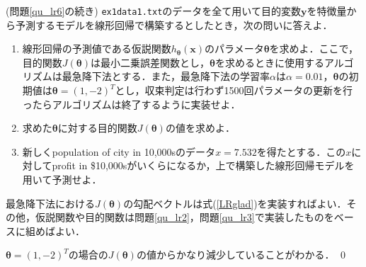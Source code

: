 \begin{qu}\label{qu_lr4}
(問題\ref{qu_lr6}の続き) \texttt{ex1data1.txt}のデータを全て用いて目的変数${\bm y}$を特徴量から予測するモデルを線形回帰で構築するとしたとき，次の問いに答えよ．
\begin{enumerate}
\item 線形回帰の予測値である仮説関数$h_{{\bm \theta}}({\bm x})$のパラメータ${\bm \theta}$を求めよ．ここで，目的関数$J({\bm \theta})$は最小二乗誤差関数とし，${\bm \theta}$を求めるときに使用するアルゴリズムは最急降下法とする．また，最急降下法の学習率$\alpha $は$\alpha = 0.01$，${\bm \theta}$の初期値は${\bm \theta}=(1,-2)^T$とし，収束判定は行わず1500回パラメータの更新を行ったらアルゴリズムは終了するように実装せよ．
\item 求めた${\bm \theta}$に対する目的関数$J({\bm \theta})$の値を求めよ．
\item 新しくpopulation of city in 10,000sのデータ$x=7.532$を得たとする．この$x$に対してprofit in \$10,000sがいくらになるか，上で構築した線形回帰モデルを用いて予測せよ．
\end{enumerate}
\end{qu}
\begin{ans}
最急降下法における$J({\bm \theta})$の勾配ベクトルは式(\ref{LRglad})を実装すればよい．その他，仮説関数や目的関数は問題\ref{qu_lr2}，問題\ref{qu_lr3}で実装したものをベースに組めばよい．
\begin{cod}[\texttt{lr4.py}]　
}]{code/lr4.py}
\vspace{-10pt}
\begin{lstlisting}
1: theta=
[[-3.55089376]
 [ 1.15838599]]
2: J=4.4878002526614615
3: y_pred=5.174069533566031
\end{lstlisting}
\end{cod}
\vspace{-10pt}
${\bm \theta}=(1,-2)^T$の場合の$J({\bm \theta})$の値からかなり減少していることがわかる．
\qed
\end{ans}

